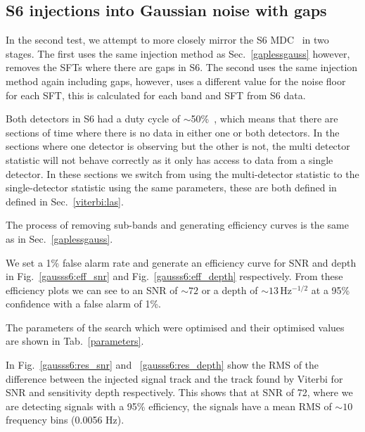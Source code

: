 \subsection{\label{gausss6} S6 injections into Gaussian noise with gaps}

%
%
In the second test, we attempt to more closely mirror the S6 \ac{MDC}~\cite{Walsh2016} in two stages. The first uses the same injection method as Sec.~\ref{gaplessgauss} however, removes the \acp{SFT} where there are gaps in S6. 
The second uses the same injection method again including gaps, however, uses a different value for the noise floor for each \ac{SFT}, this is calculated for each band and \ac{SFT} from S6 data.

Both detectors in S6 had a duty cycle of $\sim$50\%~\cite{DetCharS6}, which means that there are sections of time where there is no data in either one or both detectors. In the sections where one detector is observing but the other is not, the multi detector statistic will not behave correctly as it only has access to data from a single detector.
In these sections we switch from using the multi-detector statistic to the single-detector statistic using the same parameters, these are both defined in defined in Sec.~\ref{viterbi:las}.

%
%
The process of removing sub-bands and generating efficiency curves is the same as in Sec.~\ref{gaplessgauss}.


We set a 1\% false alarm rate and generate an efficiency curve for
\ac{SNR} and depth in Fig.~\ref{gausss6:eff_snr} and
Fig.~\ref{gausss6:eff_depth} respectively. From these efficiency plots we can
see to an \ac{SNR} of $\sim 72$ or a depth of $\sim 13$\,Hz$^{-1/2}$ at a 95\%
confidence with a false alarm of 1\%.

The parameters of the search which were optimised and their optimised values are shown in Tab.~\ref{parameters}.


In Fig.~\ref{gausss6:res_snr} and ~\ref{gausss6:res_depth} show the \ac{RMS} of the difference between the injected signal track and the track found by Viterbi for \ac{SNR} and sensitivity depth respectively. This shows that at \ac{SNR} of 72, where we are detecting signals with a 95\% efficiency, the signals have a mean \ac{RMS} of $\sim 10$ frequency bins (0.0056 Hz).

